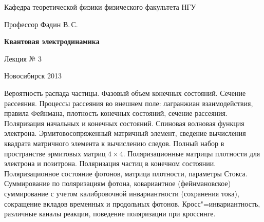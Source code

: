 \documentclass[12pt,pagesize,paper=192mm:108mm]{scrbook}
\begin{document}
\begin{titlepage}
\begin{center}
    Кафедра теоретической физики физического факультета НГУ
    \medskip

    \Large
    Профессор Фадин В.\,С.
    \bigskip

    \huge
    \textbf{Квантовая электродинамика}
    \bigskip

    \Large
    Лекция № 3
    \vfill

    \normalsize
    \vfill

    \normalsize \ccbysa\hspace{0.5em}  Новосибирск 2013
  \end{center}
\end{titlepage}
\newpage

\vspace*{-1em}
\begin{center}
\vfill
  \begin{minipage}{0.65\linewidth}
    Вероятность распада частицы. Фазовый объем конечных
    состояний. Сечение рассеяния.  Процессы рассеяния во внешнем поле:
    лагранжиан взаимодействия, правила Фейнмана, плотность конечных
    состояний, сечение рассеяния. Поляризация начальных и конечных
    состояний. Спиновая волновая функция
    электрона. Эрмитовосопряженный матричный элемент, сведение
    вычисления квадрата матричного элемента к вычислению
    следов. Полный набор в пространстве эрмитовых матриц $4 \times
    4$. Поляризационные матрицы плотности для электрона и
    позитрона. Поляризация частиц в конечном
    состоянии. Поляризационное состояние фотонов, матрица плотности,
    параметры Стокса. Суммирование по поляризациям фотона,
    ковариантное (фейнмановское) суммирование с учетом калибровочной
    инвариантности (сохранения тока), сокращение вкладов временных и
    продольных фотонов.  Кросс"=инвариантность, различные каналы
    реакции, поведение поляризации при кроссинге.
  \end{minipage}
  \vfill

\end{center}
\end{document}
